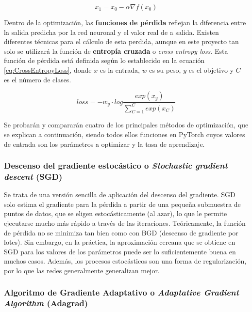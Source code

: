 \documentclass{report}
\begin{document}
\begin{equation}
    x_{1} = x_{0} - \alpha \nabla f(x_{0})
    \label{eq:DescensoGradiente}
\end{equation}


Dentro de la optimización, las \textbf{funciones de pérdida} reflejan la diferencia entre la salida predicha por la red neuronal y el valor real de a salida. Existen diferentes técnicas para el cálculo de esta perdida, aunque en este proyecto tan solo se utilizará la función de \textbf{entropía cruzada} o \textit{cross entropy loss}. Esta función de pérdida está definida según lo establecido en la ecuación \ref{eq:CrossEntropyLoss}, donde $x$ es la entrada, $w$ es su peso, $y$ es el objetivo y $C$ es el número de clases.

\begin{equation}
    loss = -w_{y} \cdot log \frac{exp(x_{y})}{\sum_{C=1}^{C} exp(x_{C})}
    \label{eq:CrossEntropyLoss}
\end{equation}

Se probarán y compararán cuatro de los principales métodos de optimización, que se explican a continuación, siendo todos ellos funciones en PyTorch cuyos valores de entrada son los parámetros a optimizar y la tasa de aprendizaje.

\subsubsection{ Descenso del gradiente estocástico o \textit{Stochastic gradient descent} (SGD)}

Se trata de una versión sencilla de aplicación del descenso del gradiente. SGD solo estima el gradiente para la pérdida a partir de una pequeña submuestra de puntos de datos, que se eligen estocásticamente (al azar), lo que le permite ejecutarse mucho más rápido a través de las iteraciones. Teóricamente, la función de pérdida no se minimiza tan bien como con BGD (descenso de gradiente por lotes). Sin embargo, en la práctica, la aproximación cercana que se obtiene en SGD para los valores de los parámetros puede ser lo suficientemente buena en muchos casos. Además, los procesos estocásticos son una forma de regularización, por lo que las redes generalmente generalizan mejor.

\subsubsection{Algoritmo de Gradiente Adaptativo o \textit{Adaptative Gradient Algorithm} (Adagrad) }
\end{document}
